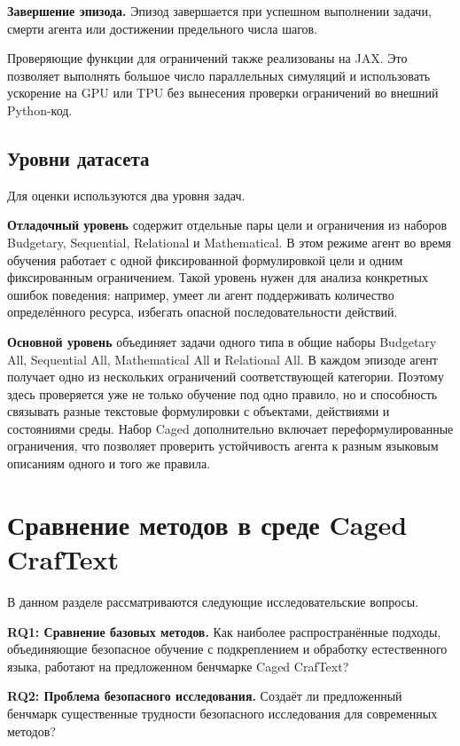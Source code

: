 \textbf{Завершение эпизода.} Эпизод завершается при успешном выполнении задачи, смерти агента или достижении предельного числа шагов.

Проверяющие функции для ограничений также реализованы на JAX. Это позволяет выполнять большое число параллельных симуляций и использовать ускорение на GPU или TPU без вынесения проверки ограничений во внешний Python-код.

\subsection{Уровни датасета}
\label{subsec:caged_datasets}

Для оценки используются два уровня задач.

\textbf{Отладочный уровень} содержит отдельные пары цели и ограничения из наборов Budgetary, Sequential, Relational и Mathematical. В этом режиме агент во время обучения работает с одной фиксированной формулировкой цели и одним фиксированным ограничением. Такой уровень нужен для анализа конкретных ошибок поведения: например, умеет ли агент поддерживать количество определённого ресурса, избегать опасной последовательности действий.

\textbf{Основной уровень} объединяет задачи одного типа в общие наборы Budgetary All, Sequential All, Mathematical All и Relational All. В каждом эпизоде агент получает одно из нескольких ограничений соответствующей категории. Поэтому здесь проверяется уже не только обучение под одно правило, но и способность связывать разные текстовые формулировки с объектами, действиями и состояниями среды. Набор Caged дополнительно включает переформулированные ограничения, что позволяет проверить устойчивость агента к разным языковым описаниям одного и того же правила.

\section{Сравнение методов в среде Caged CrafText}
\label{sec:craftext_experiments}

В данном разделе рассматриваются следующие исследовательские вопросы.

\textbf{RQ1: Сравнение базовых методов.} Как наиболее распространённые подходы, объединяющие безопасное обучение с подкреплением и обработку естественного языка, работают на предложенном бенчмарке Caged CrafText?

\textbf{RQ2: Проблема безопасного исследования.} Создаёт ли предложенный бенчмарк существенные трудности безопасного исследования для современных методов?

